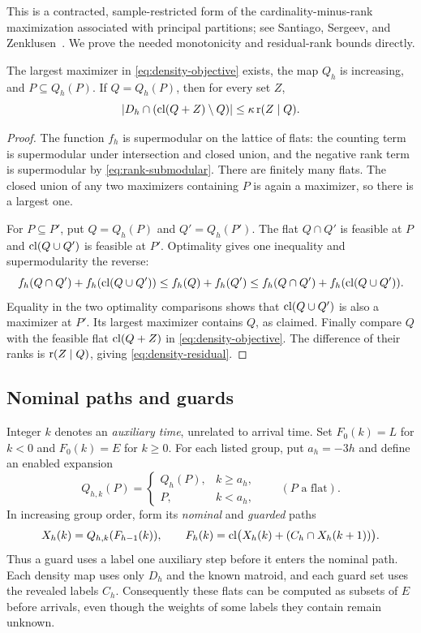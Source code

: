 This is a contracted, sample-restricted form of the cardinality-minus-rank
maximization associated with principal partitions; see Santiago, Sergeev,
and Zenklusen~\cite[Section 3.1, Equation (1)]{SSZ25}. We prove the needed
monotonicity and residual-rank bounds directly.

\begin{lemma}\label{lem:density}
The largest maximizer in \eqref{eq:density-objective} exists, the map $Q_h$
is increasing, and $P\subseteq Q_h(P)$. If $Q=Q_h(P)$, then for every set $Z$,
\begin{equation}\label{eq:density-residual}
 |D_h\cap(\operatorname{cl}(Q+Z)\setminus Q)|\le\kappa\operatorname{r}(Z\mid Q).
\end{equation}
\end{lemma}
\begin{proof}
The function $f_h$ is supermodular on the lattice of flats: the counting
term is supermodular under intersection and closed union, and the negative
rank term is supermodular by \eqref{eq:rank-submodular}. There are finitely
many flats. The closed union of any two maximizers containing $P$ is again
a maximizer, so there is a largest one.

For $P\subseteq P'$, put $Q=Q_h(P)$ and $Q'=Q_h(P')$. The flat
$Q\cap Q'$ is feasible at $P$ and $\operatorname{cl}(Q\cup Q')$ is feasible at $P'$.
Optimality gives one inequality and supermodularity the reverse:
\[
 f_h(Q\cap Q')+f_h(\operatorname{cl}(Q\cup Q'))
       \le f_h(Q)+f_h(Q')
       \le f_h(Q\cap Q')+f_h(\operatorname{cl}(Q\cup Q')).
\]
Equality in the two optimality comparisons shows that $\operatorname{cl}(Q\cup Q')$
is also a maximizer at $P'$. Its largest maximizer contains $Q$, as claimed.
Finally compare $Q$ with the feasible flat $\operatorname{cl}(Q+Z)$ in
\eqref{eq:density-objective}. The difference of their ranks is
$\operatorname{r}(Z\mid Q)$, giving \eqref{eq:density-residual}.
\end{proof}

\subsection{Nominal paths and guards}

Integer $k$ denotes an \emph{auxiliary time}, unrelated to arrival time.
Set $F_0(k)=L$ for $k<0$ and $F_0(k)=E$ for $k\ge0$. For each listed group,
put $a_h=-3h$ and define an enabled expansion
\[
 Q_{h,k}(P)=
 \begin{cases}Q_h(P),&k\ge a_h,\\ P,&k<a_h,\end{cases}
 \qquad(P\text{ a flat}).
\]
In increasing group order, form its \emph{nominal} and \emph{guarded} paths
\begin{equation}\label{eq:paths}
 X_h(k)=Q_{h,k}(F_{h-1}(k)),\qquad
 F_h(k)=\operatorname{cl}\bigl(X_h(k)+(C_h\cap X_h(k+1))\bigr).
\end{equation}
Thus a guard uses a label one auxiliary step before it enters the nominal
path. Each density map uses only $D_h$ and the known matroid, and each
guard set uses the revealed labels $C_h$. Consequently these flats can
be computed as subsets of $E$ before arrivals, even though the weights
of some labels they contain remain unknown.

